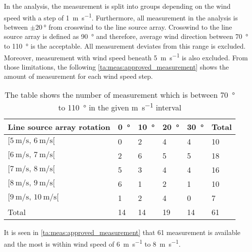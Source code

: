 In the analysis, the measurement is split into groups depending on the wind speed with a step of \SI{1}{\meter\per\second}. Furthermore, all measurement in the analysis is between $\pm\SI{20}{\degree}$ from crosswind to the line source array. Crosswind to the line source array is defined as \SI{90}{\degree} and therefore, average wind direction between \SI{70}{\degree} to \SI{110}{\degree} is the acceptable. All measurement deviates from this range is excluded. Moreover, measurement with wind speed beneath \SI{5}{\meter\per\second} is also excluded. From those limitations, the following \autoref{ta:meas:approved_measurement} shows the amount of measurement for each wind speed step. 

\begin{table}[H]
\centering
\caption{The table shows the number of measurement which is between \SI{70}{\degree} to \SI{110}{\degree} in the given \si{\meter\per\second} interval}
\begin{tabular}{l|l|l|l|l|l}
Line source array rotation & \SI{0}{\degree}  & \SI{10}{\degree} & \SI{20}{\degree} & \SI{30}{\degree} & Total \\ \hline
$[\SI{5}{\meter\per\second},\, \SI{6}{\meter\per\second}[ $         & 0  & 2  & 4  & 4  & 10    \\
$[\SI{6}{\meter\per\second},\, \SI{7}{\meter\per\second}[$           & 2  & 6  & 5  & 5  & 18    \\
$[\SI{7}{\meter\per\second},\, \SI{8}{\meter\per\second}[ $          & 5  & 3  & 4  & 4  & 16    \\
$[\SI{8}{\meter\per\second},\, \SI{9}{\meter\per\second}[ $          & 6  & 1  & 2  & 1  & 10    \\
$[\SI{9}{\meter\per\second},\, \SI{10}{\meter\per\second}[  $        & 1  & 2  & 4  & 0  & 7     \\ \hline
Total         & 14 & 14 & 19 & 14 &   61   
\end{tabular}
\label{ta:meas:approved_measurement}
\end{table}

It is seen in \autoref{ta:meas:approved_measurement} that 61 measurement is available and the most is within wind speed of \SI{6}{\meter\per\second} to \SI{8}{\meter\per\second}.

